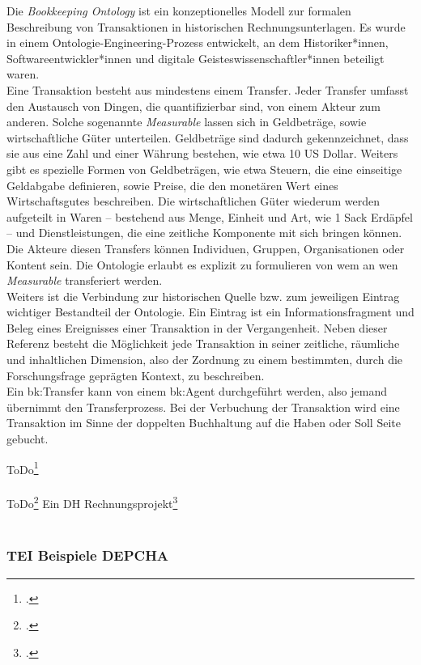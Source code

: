 \documentclass[12pt,a4paper]{article}
\begin{document}
Die \textit{Bookkeeping Ontology} ist ein konzeptionelles Modell zur formalen Beschreibung von Transaktionen in historischen Rechnungsunterlagen. Es wurde in einem Ontologie-Engineering-Prozess entwickelt, an dem Historiker*innen, Softwareentwickler*innen und digitale Geisteswissenschaftler*innen beteiligt waren.  \\
Eine Transaktion besteht aus mindestens einem Transfer. Jeder Transfer umfasst den Austausch von Dingen, die quantifizierbar sind, von einem Akteur zum anderen. Solche sogenannte \textit{Measurable} lassen sich in Geldbeträge, sowie wirtschaftliche Güter unterteilen. Geldbeträge sind dadurch gekennzeichnet, dass sie aus eine Zahl und einer Währung bestehen, wie etwa 10 US Dollar. Weiters gibt es spezielle Formen von Geldbeträgen, wie etwa Steuern, die eine einseitige Geldabgabe definieren, sowie Preise, die den monetären Wert eines Wirtschaftsgutes beschreiben. Die wirtschaftlichen Güter wiederum werden aufgeteilt in Waren -- bestehend aus Menge, Einheit und Art, wie 1 Sack Erdäpfel -- und Dienstleistungen, die eine zeitliche Komponente mit sich bringen können. Die Akteure diesen Transfers können Individuen, Gruppen, Organisationen oder Kontent sein. Die Ontologie erlaubt es explizit zu formulieren von wem an wen \textit{Measurable} transferiert werden.
\\
Weiters ist die Verbindung zur historischen Quelle bzw. zum jeweiligen Eintrag wichtiger Bestandteil der Ontologie. Ein Eintrag ist ein Informationsfragment und Beleg eines Ereignisses einer Transaktion in der Vergangenheit. Neben dieser Referenz besteht die Möglichkeit jede Transaktion in seiner zeitliche, räumliche und inhaltlichen Dimension, also der Zordnung zu einem bestimmten, durch die Forschungsfrage geprägten Kontext, zu beschreiben.
\\
Ein bk:Transfer kann von einem bk:Agent durchgeführt werden, also jemand übernimmt den Transferprozess. Bei der Verbuchung der Transaktion wird eine Transaktion im Sinne der doppelten Buchhaltung auf die Haben oder Soll Seite gebucht. 

ToDo\footcite[][S.9-12]{tomasekmedea}
\\
\\
ToDo\footcite[][S.101-109]{wurz2016dh}
Ein DH Rechnungsprojekt\footcite[][S.109-113]{wurz2016dh}
\\
\\


\subsubsection{TEI Beispiele DEPCHA}
\end{document}
